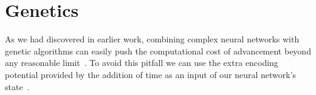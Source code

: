 \section{Genetics}

As we had discovered in earlier work, combining complex neural networks 
with genetic algorithms can easily push the computational cost of advancement
beyond any reasonable limit~\cite{Ferner2017}.
To avoid this pitfall we can use the extra encoding potential provided by 
the addition of time as an input of our neural network's state~\cite{Paugam-Moisy2012}.
